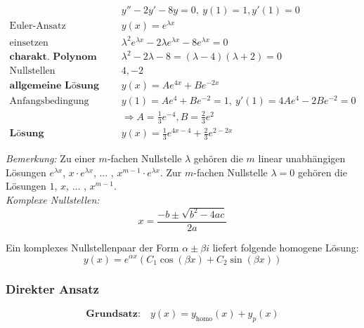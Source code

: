 \documentclass[11pt]{article}
\begin{document}
\begin{equation*}
\begin{split}
	& y'' - 2y' - 8y = 0,\ y(1) = 1, y'(1) = 0 \\
	\text{Euler-Ansatz}\quad & y(x) = e^{\lambda x} \\
	\text{einsetzen}\quad & \lambda^2 e^{\lambda x} - 2\lambda e^{\lambda x} - 8e^{\lambda x} = 0 \\
	\textbf{charakt. Polynom}\quad & \lambda^2 - 2\lambda - 8 = (\lambda - 4)(\lambda + 2) = 0 \\
	\text{Nullstellen}\quad & 4, -2 \\
	\textbf{allgemeine L{\"o}sung}\quad & y(x) = Ae^{4x} + Be^{-2x} \\
	\text{Anfangsbedingung gebrauchen}\quad & y(1) = Ae^4 + Be^{-2} = 1,\ y'(1) = 4Ae^4 - 2Be^{-2} = 0 \\
											& \Rightarrow A = \frac{1}{3}e^{-4}, B = \frac{2}{3}e^2 \\
	\textbf{L{\"o}sung}\quad & y(x) = \frac{1}{3}e^{4x-4} + \frac{2}{3}e^{2-2x}
\end{split}
\end{equation*}

\emph{Bemerkung:} Zu einer $m$-fachen Nullstelle $\lambda$ geh{\"o}ren die $m$ linear unabh{\"a}ngigen L{\"o}sungen $e^{\lambda x}$, $x\cdot e^{\lambda x}$, ... , $x^{m-1}\cdot e^{\lambda x}$. Zur $m$-fachen Nullstelle $\lambda = 0$ geh{\"o}ren die L{\"o}sungen $1$, $x$, ... , $x^{m-1}$. \\
 
\emph{Komplexe Nullstellen:} \\

\begin{equation*}
	x = \frac{-b \pm \sqrt{b^2-4ac}}{2a}
\end{equation*}

Ein komplexes Nullstellenpaar der Form $\alpha \pm \beta i$ liefert folgende homogene L{\"o}sung:
\begin{equation*}
	y(x)=e^{\alpha x}(C_1\cos(\beta x) + C_2\sin(\beta x))
\end{equation*}

\subsubsection{Direkter Ansatz}

\begin{equation*}
	\textbf{Grundsatz:}\quad y(x) = y_\text{homo}(x) + y_p(x)
\end{equation*}
\end{document}
